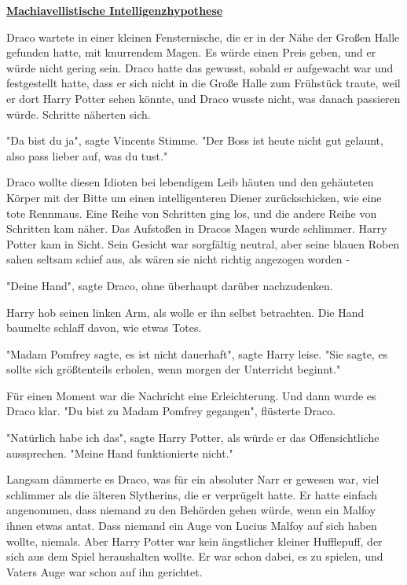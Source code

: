 

\hypertarget{machiavellistische-intelligenzhypothese}{%

\textbf{\uline{Machiavellistische Intelligenzhypothese}}

Draco wartete in einer kleinen Fensternische, die er in der Nähe der Großen Halle gefunden hatte, mit knurrendem Magen. Es würde einen Preis geben, und er würde nicht gering sein. Draco hatte das gewusst, sobald er aufgewacht war und festgestellt hatte, dass er sich nicht in die Große Halle zum Frühstück traute, weil er dort Harry Potter sehen könnte, und Draco wusste nicht, was danach passieren würde. Schritte näherten sich.

"Da bist du ja", sagte Vincents Stimme. "Der Boss ist heute nicht gut gelaunt, also pass lieber auf, was du tust."

Draco wollte diesen Idioten bei lebendigem Leib häuten und den gehäuteten Körper mit der Bitte um einen intelligenteren Diener zurückschicken, wie eine tote Rennmaus. Eine Reihe von Schritten ging los, und die andere Reihe von Schritten kam näher. Das Aufstoßen in Dracos Magen wurde schlimmer. Harry Potter kam in Sicht. Sein Gesicht war sorgfältig neutral, aber seine blauen Roben sahen seltsam schief aus, als wären sie nicht richtig angezogen worden -

"Deine Hand", sagte Draco, ohne überhaupt darüber nachzudenken.

Harry hob seinen linken Arm, als wolle er ihn selbst betrachten. Die Hand baumelte schlaff davon, wie etwas Totes.

"Madam Pomfrey sagte, es ist nicht dauerhaft", sagte Harry leise. "Sie sagte, es sollte sich größtenteils erholen, wenn morgen der Unterricht beginnt."

Für einen Moment war die Nachricht eine Erleichterung. Und dann wurde es Draco klar. "Du bist zu Madam Pomfrey gegangen", flüsterte Draco.

"Natürlich habe ich das", sagte Harry Potter, als würde er das Offensichtliche aussprechen. "Meine Hand funktionierte nicht."

Langsam dämmerte es Draco, was für ein absoluter Narr er gewesen war, viel schlimmer als die älteren Slytherins, die er verprügelt hatte. Er hatte einfach angenommen, dass niemand zu den Behörden gehen würde, wenn ein Malfoy ihnen etwas antat. Dass niemand ein Auge von Lucius Malfoy auf sich haben wollte, niemals. Aber Harry Potter war kein ängstlicher kleiner Hufflepuff, der sich aus dem Spiel heraushalten wollte. Er war schon dabei, es zu spielen, und Vaters Auge war schon auf ihn gerichtet.

}
